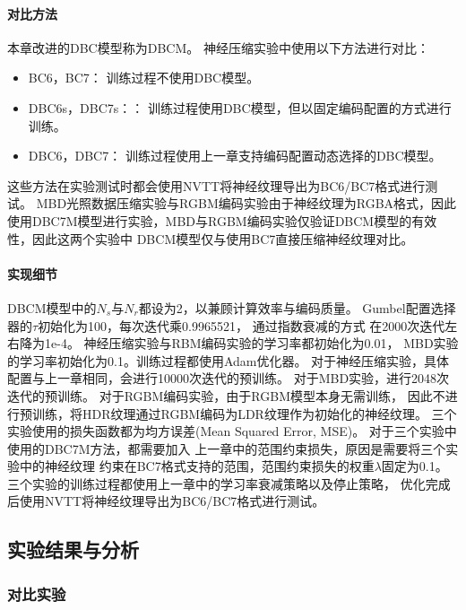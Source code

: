 \paragraph{对比方法}

本章改进的DBC模型称为DBCM。
神经压缩实验中使用以下方法进行对比：

\begin{itemize}
    \item BC6，BC7： 训练过程不使用DBC模型。
    \item DBC6s，DBC7s：： 训练过程使用DBC模型，但以固定编码配置的方式进行训练。
    \item DBC6，DBC7： 训练过程使用上一章支持编码配置动态选择的DBC模型。    
\end{itemize}

这些方法在实验测试时都会使用NVTT将神经纹理导出为BC6/BC7格式进行测试。
MBD光照数据压缩实验与RGBM编码实验由于神经纹理为RGBA格式，因此
使用DBC7M模型进行实验，MBD与RGBM编码实验仅验证DBCM模型的有效性，因此这两个实验中
DBCM模型仅与使用BC7直接压缩神经纹理对比。

\paragraph{实现细节}

DBCM模型中的$N_s$与$N_r$都设为2，以兼顾计算效率与编码质量。
Gumbel配置选择器的$\tau$初始化为100，每次迭代乘0.9965521，
通过指数衰减的方式
在2000次迭代左右降为1e-4。
神经压缩实验与RBM编码实验的学习率都初始化为0.01，
MBD实验的学习率初始化为0.1。训练过程都使用Adam优化器。
对于神经压缩实验，具体配置与上一章相同，会进行10000次迭代的预训练。
对于MBD实验，进行2048次迭代的预训练。
对于RGBM编码实验，由于RGBM模型本身无需训练，
因此不进行预训练，将HDR纹理通过RGBM编码为LDR纹理作为初始化的神经纹理。
三个实验使用的损失函数都为均方误差(Mean Squared Error, MSE)。
对于三个实验中使用的DBC7M方法，都需要加入
上一章中的范围约束损失，原因是需要将三个实验中的神经纹理
约束在BC7格式支持的范围，范围约束损失的权重$\lambda$固定为0.1。
三个实验的训练过程都使用上一章中的学习率衰减策略以及停止策略，
优化完成后使用NVTT将神经纹理导出为BC6/BC7格式进行测试。

\subsection{实验结果与分析}

\subsubsection{对比实验}
\label{4:对比实验}


